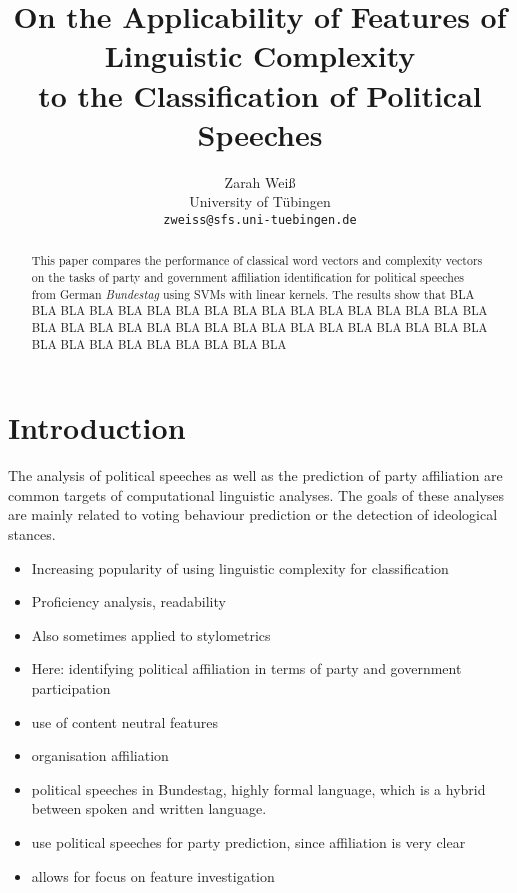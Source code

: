 \documentclass[11pt]{article}
\title{On the Applicability of Features of Linguistic Complexity \\ to the Classification of Political Speeches}
\author{Zarah Weiß \\
  University of Tübingen \\
  {\tt zweiss@sfs.uni-tuebingen.de} \\}
\date{}
\begin{document}
\maketitle
\begin{abstract}
This paper compares the performance of classical word vectors and complexity vectors on the tasks of party and government affiliation identification for political speeches from German \textit{Bundestag} using SVMs with linear kernels. The results show that  BLA BLA BLA BLA BLA BLA BLA BLA BLA BLA BLA BLA BLA BLA BLA BLA BLA BLA BLA BLA BLA BLA BLA BLA BLA BLA BLA BLA BLA BLA BLA BLA BLA BLA BLA BLA BLA BLA BLA BLA BLA BLA 
\end{abstract}


\section{Introduction}

The analysis of political speeches as well as the prediction of party affiliation are common targets of computational linguistic analyses. The goals of these analyses are mainly related to voting behaviour prediction or the detection of ideological stances. 






\begin{itemize}
\item Increasing popularity of using linguistic complexity for classification
\item Proficiency analysis, readability
\item Also sometimes applied to stylometrics
\item Here: identifying political affiliation in terms of party and government participation
\item use of content neutral features
\item organisation affiliation
\item political speeches in Bundestag, highly formal language, which is a hybrid between spoken and written language. 
\item use political speeches for party prediction, since affiliation is very clear
\item allows for focus on feature investigation
\end{itemize}

\end{document}
